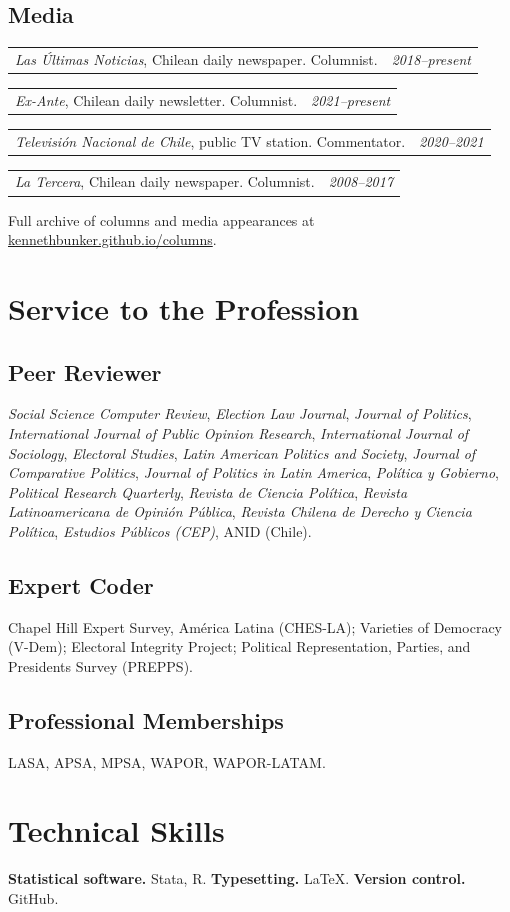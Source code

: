 \documentclass[11pt,letterpaper]{article}
\makeatletter
\newif\ifafterhead
\newlength{\entrygap}\setlength{\entrygap}{8.5pt}
\newcommand{\gap}{\ifafterhead\global\afterheadfalse\else\vspace{\entrygap}\fi}
\newcommand{\entry}[1]{\par\gap\hangindent=13pt\hangafter=1\noindent #1\par}
\newcommand{\dated}[2]{\par\gap\noindent\begin{tabularx}{\linewidth}{@{}X@{\hspace{6pt}}r@{}}#1 & \textit{#2}\end{tabularx}\par}
\makeatother
\begin{document}
\subsection{Media}
\dated{\textit{Las Últimas Noticias}, Chilean daily newspaper. Columnist.}{2018--present}
\dated{\textit{Ex-Ante}, Chilean daily newsletter. Columnist.}{2021--present}
\dated{\textit{Televisión Nacional de Chile}, public TV station. Commentator.}{2020--2021}
\dated{\textit{La Tercera}, Chilean daily newspaper. Columnist.}{2008--2017}
\entry{Full archive of columns and media appearances at \href{https://kennethbunker.github.io/columns/}{kennethbunker.github.io/columns}.}

\section{Service to the Profession}
\subsection{Peer Reviewer}
\textit{Social Science Computer Review}, \textit{Election Law Journal}, \textit{Journal of Politics}, \textit{International Journal of Public Opinion Research}, \textit{International Journal of Sociology}, \textit{Electoral Studies}, \textit{Latin American Politics and Society}, \textit{Journal of Comparative Politics}, \textit{Journal of Politics in Latin America}, \textit{Política y Gobierno}, \textit{Political Research Quarterly}, \textit{Revista de Ciencia Política}, \textit{Revista Latinoamericana de Opinión Pública}, \textit{Revista Chilena de Derecho y Ciencia Política}, \textit{Estudios Públicos (CEP)}, ANID (Chile).

\subsection{Expert Coder}
Chapel Hill Expert Survey, América Latina (CHES-LA); Varieties of Democracy (V-Dem); Electoral Integrity Project; Political Representation, Parties, and Presidents Survey (PREPPS).

\subsection{Professional Memberships}
LASA, APSA, MPSA, WAPOR, WAPOR-LATAM.

\section{Technical Skills}
\textbf{Statistical software.} Stata, R. \quad \textbf{Typesetting.} LaTeX. \quad \textbf{Version control.} GitHub.
\end{document}
